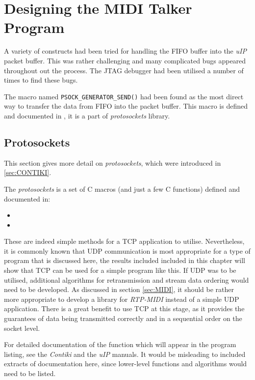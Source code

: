 \section{Designing the MIDI Talker Program}

  A variety of constructs had been tried for handling the
 FIFO  buffer into the \emph{uIP} packet buffer. This was
 rather challenging and many complicated bugs appeared
 throughout out the process. The JTAG debugger had been
 utilised a number of times to find these bugs.

  The macro named \texttt{PSOCK\_GENERATOR\_SEND()} had
 been found as the most direct way to transfer the data
 from FIFO into the packet buffer. This macro is defined
 and documented in , it is a part
 of \Contiki \emph{protosockets} library.

\subsection{Protosockets}

  This section gives more detail on \emph{protosockets},
 which were introduced in \ref{sec:CONTIKI}.

  The \emph{protosockets}  is a set of C macros (and just
 a few C functions) defined and documented in:
 \begin{itemize}	
	\item{}
	\item{}
 \end{itemize}

 These are indeed simple methods for a TCP application to
 utilise. Nevertheless, it is commonly known that UDP
 communication is most appropriate for a type of program
 that is discussed here, the results included included in
 this chapter will show that TCP can be used for a simple
 program like this. If UDP was to be utilised, additional
 algorithms for retransmission and stream data ordering
 would need to be developed. As discussed in section
 \ref{sec:MIDI}, it should be rather more appropriate to
 develop a library for \emph{RTP-MIDI} instead of a simple
 UDP application. There is a great benefit to use TCP at
 this stage, as it provides the guarantees of data being
 transmitted correctly and in a sequential order on the
 socket level.

 For detailed documentation of the function which will
 appear in the program listing, see the \emph{Contiki}
 \cite{contik:docs} and the \emph{uIP} \cite{contik:uip}
 manuals. It would be misleading to included extracts
 of documentation here, since lower-level functions
 and algorithms would need to be listed.
